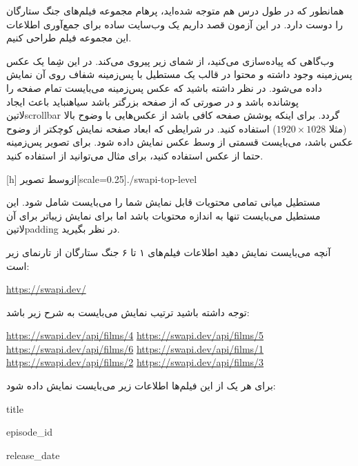 \documentclass[../main.tex]{subfiles}
\begin{document}

همانطور که در طول درس هم متوجه شده‌اید، پرهام مجموعه فیلم‌های جنگ ستارگان را دوست دارد.
در این آزمون قصد داریم یک وب‌سایت ساده برای جمع‌آوری اطلاعات این مجموعه فیلم طراحی کنیم.

وب‌گاهی که پیاده‌سازی می‌کنید، از شمای زیر پیروی می‌کند. در این شِما یک عکس پس‌زمینه وجود داشته و محتوا در قالب یک مستطیل با پس‌زمینه شفاف روی آن نمایش داده می‌شود.
در نظر داشته باشید که عکس پس‌زمینه می‌بایست تمام صفحه را پوشانده باشد و در صورتی که از صفحه بزرگتر باشد ‌سیاه{نباید} باعث ایجاد ‌لاتین{scrollbar} گردد.
برای اینکه پوشش صفحه کافی باشد از عکس‌هایی با وضوح بالا (مثلا $1920 \times 1028$) استفاده کنید.
در شرایطی که ابعاد صفحه نمایش کوچکتر از وضوح عکس باشد، می‌بایست قسمتی از وسط عکس نمایش داده شود.
برای تصویر پس‌زمینه حتما از عکس استفاده کنید، برای مثال می‌توانید از  استفاده کنید.

[h]
  ‌ازوسط
  ‌تصویر[scale=0.25]{./swapi-top-level}

مستطیل میانی تمامی محتویات قابل نمایش شما را می‌بایست شامل شود. این مستطیل می‌بایست تنها به اندازه محتویات باشد اما
برای نمایش زیباتر برای آن ‌لاتین{padding} در نظر بگیرید.


آنچه می‌بایست نمایش دهید اطلاعات فیلم‌های ۱ تا ۶ جنگ ستارگان از تارنمای زیر است:

\begin{latin}
  \url{https://swapi.dev/}
\end{latin}

توجه داشته باشید ترتیب نمایش می‌بایست به شرح زیر باشد:

\begin{latin}
  \url{https://swapi.dev/api/films/4}
  \url{https://swapi.dev/api/films/5}
  \url{https://swapi.dev/api/films/6}
  \url{https://swapi.dev/api/films/1}
  \url{https://swapi.dev/api/films/2}
  \url{https://swapi.dev/api/films/3}
\end{latin}

برای هر یک از این فیلم‌ها اطلاعات زیر می‌بایست نمایش داده شود:

\begin{itemize}\begin{latinitems}
  \item title
  \item episode\_id
  \item release\_date
\end{latinitems}\end{itemize}
\end{document}
